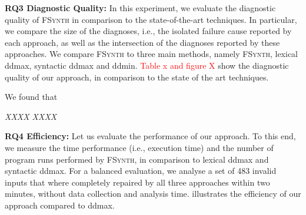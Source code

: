 \documentclass[sigconf,review,anonymous]{acmart}
\newenvironment{result}{\begin{framed}\centering\it}{\end{framed}}
\newcounter{todocounter}
\newcommand{\todo}[1]{\marginpar{$|$}\textcolor{red}{\stepcounter{todocounter}\footnote[\thetodocounter]{\textcolor{red}{\textbf{TODO }}\textit{#1}}}}
\newcommand{\recheck}[1]{\textcolor{red}{#1}}
\renewcommand{\todo}[1]{}
\newcommand{\approach}{\textsc{FSynth}\xspace}
\begin{document}
\noindent
\textbf{RQ3 Diagnostic Quality:} \todo{fix to new evaluation results}
In this experiment, we evaluate the diagnostic quality of \approach in comparison to the state-of-the-art techniques. In particular, we compare the size of the diagnoses, i.e., the isolated failure cause reported by each approach, as well as the intersection of the diagnoses reported by these approaches. We compare \approach to three main methods, namely \approach, lexical ddmax, syntactic ddmax and ddmin.  \recheck{Table x and figure X} show the diagnostic quality of our approach, in comparison to the state of the art techniques.

We found that

\begin{result}
XXXX
XXXX
\end{result}





\noindent
\textbf{RQ4 Efficiency:} \todo{fix to new evaluation results}
Let us evaluate the performance of our approach.
To this end, we measure the time performance (i.e., execution time) and the number of program runs performed
by \approach, in comparison to lexical ddmax and syntactic ddmax. For a balanced evaluation, we
analyse a set of 483 invalid inputs %
that where completely repaired by all three approaches within %
two minutes, %
without %
data collection and %
analysis time.
illustrates the efficiency of our approach compared to ddmax. %

\end{document}
